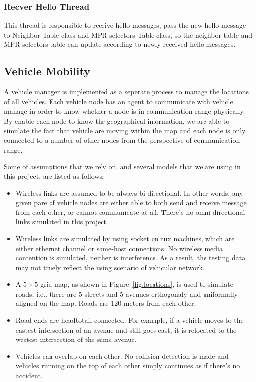 \documentclass[twocolumn]{article}
\begin{document}
    \subsubsection{Recver Hello Thread}
    \label{sec:recver_hello_main}
    \par{This thread is responsible to receive hello messages, pass the new hello message to Neighbor Table class and MPR selectors Table class, so the neighbor table and MPR selectors table can update according to newly received hello messages.}



    \subsection{Vehicle Mobility}
    \par{A vehicle manager is implemented as a seperate process to manage the locations of all vehicles. Each vehicle node has an agent to communicate with vehicle manage in order to know whether a node is in communication range physically. By enable each node to know the geographical information, we are able to simulate the fact that vehicle are moving within the map and each node is only connected to a number of other nodes from the perspective of communication range.}
    \par{Some of assumptions that we rely on, and several models that we are using in this project, are listed as follows:
        \begin{itemize}
        \item Wireless links are assumed to be always bi-directional. In other words, any given pare of vehicle nodes are either able to both send and receive message from each other, or cannot communicate at all. There's no omni-directional links simulated in this project.
        \item Wireless links are simulated by using socket on tux machines, which are either ethernet channel or same-host connections. No wireless media contention is simulated, neither is interference. As a result, the testing data may not truely reflect the using scenario of vehicular network.
        \item A $5 \times 5$ grid map, as shown in Figure~\ref{fig:locations}, is used to simulate roads, i.e., there are 5 streets and 5 avenues orthogonaly and uniformally aligned on the map. Roads are 120 meters from each other.
        \item Road ends are headtotail connected. For example, if a vehicle moves to the eastest intersection of an avenue and still goes east, it is relocated to the westest intersection of the same avenue.
        \item Vehicles can overlap on each other. No collision detection is made and vehicles running on the top of each other simply continues as if there's no accident.
        \end{itemize}
    }
\end{document}
